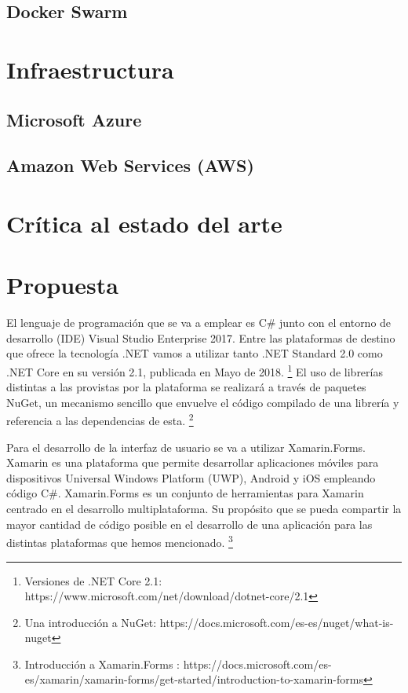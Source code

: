 \documentclass[11pt,spanish,listoffigures]{tfgetsinf}
\begin{document}
\subsection{Docker Swarm}


\section{Infraestructura}

\subsection{Microsoft Azure}

\subsection{Amazon Web Services (AWS)}

\section{Crítica al estado del arte}

\section{Propuesta} \label{sect:Propuesta}

El lenguaje de programación que se va a emplear es C\# junto con el entorno de desarrollo (IDE) Visual Studio Enterprise 2017. Entre las plataformas de destino que ofrece la tecnología .NET vamos a utilizar tanto .NET Standard 2.0 como .NET Core en su versión 2.1, publicada en Mayo de 2018. \footnote{ Versiones de .NET Core 2.1: https://www.microsoft.com/net/download/dotnet-core/2.1} El uso de librerías distintas a las provistas por la plataforma se realizará a través de paquetes NuGet, un mecanismo sencillo que envuelve el código compilado de una librería y referencia a las dependencias de esta. \footnote{ Una introducción a NuGet: https://docs.microsoft.com/es-es/nuget/what-is-nuget}

Para el desarrollo de la interfaz de usuario se va a utilizar Xamarin.Forms. Xamarin es una plataforma que permite desarrollar aplicaciones móviles para dispositivos Universal Windows Platform (UWP), Android y iOS empleando código C\#. Xamarin.Forms es un conjunto de herramientas para Xamarin centrado en el desarrollo multiplataforma. Su propósito que se pueda compartir la mayor cantidad de código posible en el desarrollo de una aplicación para las distintas plataformas que hemos mencionado. \footnote{ Introducción a Xamarin.Forms
: https://docs.microsoft.com/es-es/xamarin/xamarin-forms/get-started/introduction-to-xamarin-forms}
\end{document}
